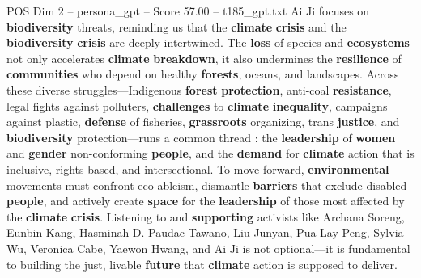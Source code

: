 \begin{textsample}{POS Dim 2 – persona\_gpt – Score 57.00 – t185\_gpt.txt}
Ai Ji focuses on \textbf{biodiversity} threats, reminding us that the \textbf{climate} \textbf{crisis} and the \textbf{biodiversity} \textbf{crisis} are deeply intertwined.
The \textbf{loss} of species and \textbf{ecosystems} not only accelerates \textbf{climate} \textbf{breakdown}, it also undermines the \textbf{resilience} of \textbf{communities} who depend on healthy \textbf{forests}, oceans, and landscapes.
Across these diverse struggles—Indigenous \textbf{forest} \textbf{protection}, anti-coal \textbf{resistance}, legal fights against polluters, \textbf{challenges} to \textbf{climate} \textbf{inequality}, campaigns against plastic, \textbf{defense} of fisheries, \textbf{grassroots} organizing, trans \textbf{justice}, and \textbf{biodiversity} protection—runs a common thread : the \textbf{leadership} of \textbf{women} and \textbf{gender} non-conforming \textbf{people}, and the \textbf{demand} for \textbf{climate} action that is inclusive, rights-based, and intersectional.
To move forward, \textbf{environmental} movements must confront eco-ableism, dismantle \textbf{barriers} that exclude disabled \textbf{people}, and actively create \textbf{space} for the \textbf{leadership} of those most affected by the \textbf{climate} \textbf{crisis}.
Listening to and \textbf{supporting} activists like Archana Soreng, Eunbin Kang, Hasminah D.
Paudac-Tawano, Liu Junyan, Pua Lay Peng, Sylvia Wu, Veronica Cabe, Yaewon Hwang, and Ai Ji is not optional—it is fundamental to building the just, livable \textbf{future} that \textbf{climate} action is supposed to deliver.

\end{textsample}
